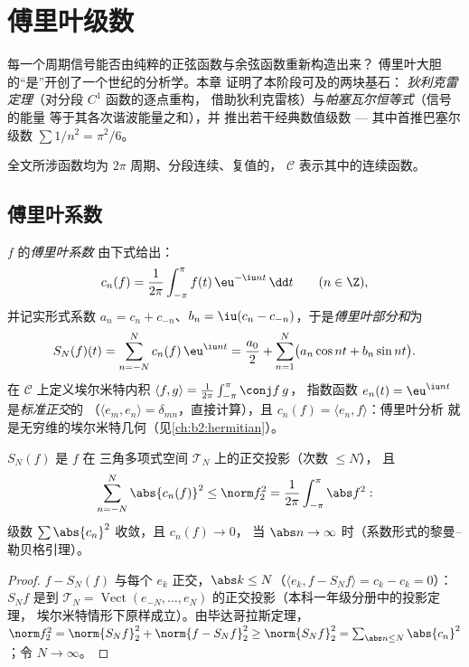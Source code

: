 \chapter{傅里叶级数}\label{ch:b2:fourier}

每一个周期信号能否由纯粹的正弦函数与余弦函数重新构造出来？
傅里叶大胆的“是”开创了一个世纪的分析学。本章
证明了本阶段可及的两块基石：
\emph{狄利克雷定理}（对分段 $C^1$ 函数的逐点重构，
借助狄利克雷核）与\emph{帕塞瓦尔恒等式}（信号的能量
等于其各次谐波能量之和），并
推出若干经典数值级数 --- 其中首推巴塞尔级数 $\sum 1/n^2 =
\pi^2/6$。

全文所涉函数均为 $2\pi$ 周期、分段连续、复值的，
$\mathcal{C}$ 表示其中的连续函数。

\section{傅里叶系数}

\begin{definition}\label{def:b2:fourier:coefficients}
$f$ 的\emph{傅里叶系数}
由下式给出：
\[
c_n(f) = \frac{1}{2\pi}\int_{-\pi}^{\pi} f(t)\,\eu^{-\iu n t}\,\dd
t \qquad (n \in \Z),
\]
并记实形式系数 $a_n = c_n + c_{-n}$、$b_n = \iu(c_n
- c_{-n})$，于是\emph{傅里叶部分和}为
\[
S_N(f)(t) = \sum_{n=-N}^{N} c_n(f)\,\eu^{\iu nt}
= \frac{a_0}{2} + \sum_{n=1}^{N}\bigl(a_n\cos nt + b_n \sin
nt\bigr).
\]
在 $\mathcal{C}$ 上定义埃尔米特内积 $\langle f,
g\rangle = \frac{1}{2\pi}\int_{-\pi}^{\pi}\conj f\,g$，
指数函数 $e_n(t) = \eu^{\iu nt}$ 是\emph{标准正交}的
（$\langle e_m, e_n\rangle = \delta_{mn}$，直接计算），且
$c_n(f) = \langle e_n, f\rangle$：傅里叶分析
就是无穷维的埃尔米特几何（见\cref{ch:b2:hermitian}）。
\end{definition}

\begin{proposition}[贝塞尔不等式]\label{prop:b2:fourier:bessel}
$S_N(f)$ 是 $f$ 在
三角多项式空间 $\mathcal{T}_N$ 上的正交投影（次数 $\leq N$），
且
\[
\sum_{n=-N}^{N} \abs{c_n(f)}^2 \leq \norm f_2^2 =
\frac{1}{2\pi}\int_{-\pi}^{\pi} \abs f^2 :
\]
级数 $\sum \abs{c_n}^2$ 收敛，且 $c_n(f) \to 0$，
当 $\abs n \to \infty$ 时（系数形式的黎曼–勒贝格引理）。
\end{proposition}

\begin{proof}
$f - S_N(f)$ 与每个 $e_k$ 正交，$\abs k \leq N$（$\langle
e_k, f - S_N f\rangle = c_k - c_k = 0$）：$S_Nf$ 是到
$\mathcal{T}_N = \operatorname{Vect}(e_{-N}, \dots,
e_N)$ 的正交投影（本科一年级分册中的投影定理，
埃尔米特情形下原样成立）。由毕达哥拉斯定理，$\norm f_2^2 = \norm{S_Nf}_2^2 +
\norm{f - S_Nf}_2^2 \geq \norm{S_Nf}_2^2 = \sum_{\abs n \leq N}
\abs{c_n}^2$；令 $N \to \infty$。
\end{proof}

